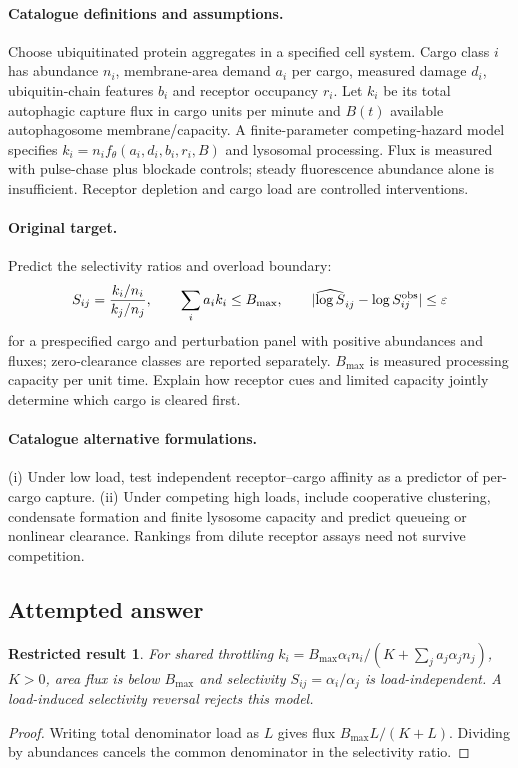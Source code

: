 \documentclass[11pt]{article}
\newtheorem{attemptresult}{Restricted result}[section]
\begin{document}
\paragraph{Catalogue definitions and assumptions.}
Choose ubiquitinated protein aggregates in a specified cell system. Cargo class $i$ has abundance $n_i$, membrane-area demand $a_i$ per cargo, measured damage $d_i$, ubiquitin-chain features $b_i$ and receptor occupancy $r_i$. Let $k_i$ be its total autophagic capture flux in cargo units per minute and $B(t)$ available autophagosome membrane/capacity. A finite-parameter competing-hazard model specifies $k_i=n_i f_\theta(a_i,d_i,b_i,r_i,B)$ and lysosomal processing. Flux is measured with pulse-chase plus blockade controls; steady fluorescence abundance alone is insufficient. Receptor depletion and cargo load are controlled interventions.
\paragraph{Original target.}
Predict the selectivity ratios and overload boundary:
\[
S_{ij}=\frac{k_i/n_i}{k_j/n_j},\qquad
\sum_i a_i k_i\leq B_{\max},\qquad
|\widehat{\log S}_{ij}-\log S^{\rm obs}_{ij}|\leq\varepsilon
\]
for a prespecified cargo and perturbation panel with positive abundances and fluxes; zero-clearance classes are reported separately. $B_{\max}$ is measured processing capacity per unit time. Explain how receptor cues and limited capacity jointly determine which cargo is cleared first.
\paragraph{Catalogue alternative formulations.}
(i) Under low load, test independent receptor--cargo affinity as a predictor of per-cargo capture. (ii) Under competing high loads, include cooperative clustering, condensate formation and finite lysosome capacity and predict queueing or nonlinear clearance. Rankings from dilute receptor assays need not survive competition.
\subsection{Attempted answer}
\begin{attemptresult}
For shared throttling $k_i=B_{\max}\alpha_i n_i/(K+\sum_ja_j\alpha_jn_j)$, $K>0$, area flux is below $B_{\max}$ and selectivity $S_{ij}=\alpha_i/\alpha_j$ is load-independent. A load-induced selectivity reversal rejects this model.
\end{attemptresult}
\begin{proof}
Writing total denominator load as $L$ gives flux $B_{\max}L/(K+L)$. Dividing by abundances cancels the common denominator in the selectivity ratio.
\end{proof}
\end{document}
